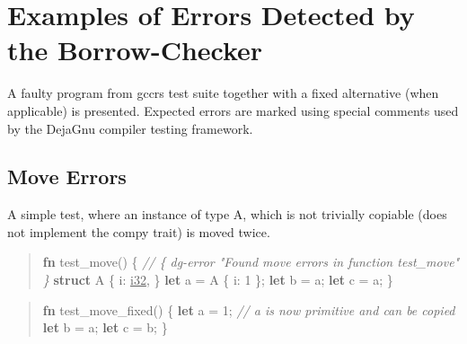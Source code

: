 \documentclass[
  11pt,
  twoside,symmetric]{report}
\newenvironment{Shaded}{}{}
\newcommand{\CommentTok}[1]{\textit{#1}}
\newcommand{\DataTypeTok}[1]{\underline{#1}}
\newcommand{\DecValTok}[1]{#1}
\newcommand{\KeywordTok}[1]{\textbf{#1}}
\newcommand{\NormalTok}[1]{#1}
\newcommand{\OperatorTok}[1]{#1}
\begin{document}
\chapter{Examples of Errors Detected by the
Borrow-Checker}\label{sec:errors}

A faulty program from gccrs test suite together with a fixed alternative
(when applicable) is presented. Expected errors are marked using special
comments used by the DejaGnu compiler testing framework.

\section{Move Errors}\label{move-errors}

A simple test, where an instance of type A, which is not trivially
copiable (does not implement the compy trait) is moved twice.

\begin{quote}
\begin{Shaded}
\begin{Highlighting}[]
\KeywordTok{fn}\NormalTok{ test\_move() }\OperatorTok{\{}
    \CommentTok{// \{ dg{-}error "Found move errors in function test\_move" \}}
    \KeywordTok{struct}\NormalTok{ A }\OperatorTok{\{}
\NormalTok{        i}\OperatorTok{:} \DataTypeTok{i32}\OperatorTok{,}
    \OperatorTok{\}}
    \KeywordTok{let}\NormalTok{ a }\OperatorTok{=}\NormalTok{ A }\OperatorTok{\{}\NormalTok{ i}\OperatorTok{:} \DecValTok{1} \OperatorTok{\};}
    \KeywordTok{let}\NormalTok{ b }\OperatorTok{=}\NormalTok{ a}\OperatorTok{;}
    \KeywordTok{let}\NormalTok{ c }\OperatorTok{=}\NormalTok{ a}\OperatorTok{;}
\OperatorTok{\}}
\end{Highlighting}
\end{Shaded}
\end{quote}

\begin{quote}
\begin{Shaded}
\begin{Highlighting}[]
\KeywordTok{fn}\NormalTok{ test\_move\_fixed() }\OperatorTok{\{}
    \KeywordTok{let}\NormalTok{ a }\OperatorTok{=} \DecValTok{1}\OperatorTok{;} \CommentTok{// a is now primitive and can be copied}
    \KeywordTok{let}\NormalTok{ b }\OperatorTok{=}\NormalTok{ a}\OperatorTok{;}
    \KeywordTok{let}\NormalTok{ c }\OperatorTok{=}\NormalTok{ b}\OperatorTok{;}
\OperatorTok{\}}
\end{Highlighting}
\end{Shaded}
\end{quote}
\end{document}
